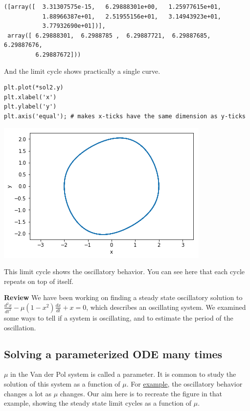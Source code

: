 \documentclass[11pt]{article}
\begin{document}
\begin{verbatim}
([array([  3.31307575e-15,   6.29888301e+00,   1.25977615e+01,
           1.88966387e+01,   2.51955156e+01,   3.14943923e+01,
           3.77932690e+01])],
 array([ 6.29888301,  6.2988785 ,  6.29887721,  6.29887685,  6.29887676,
         6.29887672]))
\end{verbatim}

And the limit cycle shows practically a single curve.

\begin{verbatim}
plt.plot(*sol2.y)
plt.xlabel('x')
plt.ylabel('y')
plt.axis('equal'); # makes x-ticks have the same dimension as y-ticks
\end{verbatim}

\begin{center}
\includegraphics[width=.9\linewidth]{obipy-resources/c515c00ecd6370edf5b32608ff70731e-38847qtj.png}
\end{center}

This limit cycle shows the oscillatory behavior. You can see here that each cycle repeats on top of itself.

\textbf{Review} We have been working on finding a steady state oscillatory solution to \(\frac{d^2x}{dt^2} - \mu(1-x^2)\frac{dx}{dt} + x = 0\), which describes an oscillating system. We examined some ways to tell if a system is oscillating, and to estimate the period of the oscillation.

\subsection{Solving a parameterized ODE many times}
\label{sec:orgc665bf6}

\(\mu\) in the Van der Pol system is called a parameter. It is common to study the solution of this system as a function of \(\mu\). For \href{https://en.wikipedia.org/wiki/Van\_der\_Pol\_oscillator\#/media/File:VanderPol-lc.svg}{example}, the oscillatory behavior changes a lot as \(\mu\) changes. Our aim here is to recreate the figure in that example, showing the steady state limit cycles as a function of \(\mu\).
\end{document}
